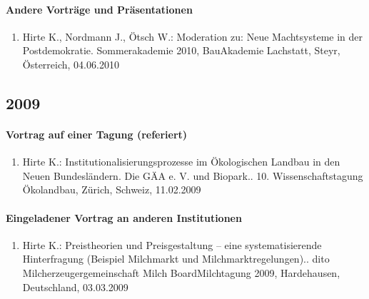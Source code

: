 \paragraph{Andere Vorträge und Präsentationen}
\begin{enumerate}
	\item Hirte K., Nordmann J., Ötsch W.: Moderation zu: Neue Machtsysteme in der Postdemokratie. Sommerakademie 2010, BauAkademie Lachstatt, Steyr, Österreich, 04.06.2010
\end{enumerate}
\subsection*{2009}
\paragraph{Vortrag auf einer Tagung (referiert)}
\begin{enumerate}
	\item Hirte K.: Institutionalisierungsprozesse im Ökologischen Landbau in den Neuen Bundesländern. Die GÄA e. V. und Biopark.. 10. Wissenschaftstagung Ökolandbau, Zürich, Schweiz, 11.02.2009
\end{enumerate}
\paragraph{Eingeladener Vortrag an anderen Institutionen}
\begin{enumerate}
	\item Hirte K.: Preistheorien und Preisgestaltung – eine systematisierende Hinterfragung (Beispiel Milchmarkt und Milchmarktregelungen).. dito Milcherzeugergemeinschaft Milch BoardMilchtagung 2009, Hardehausen, Deutschland, 03.03.2009
\end{enumerate}
